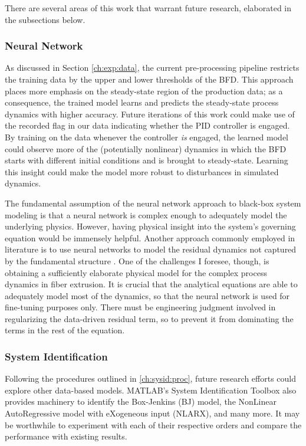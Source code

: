 There are several areas of this work that warrant future research, elaborated in the subsections below. 

\subsubsection{Neural Network}

As discussed in Section \ref{ch:exp:data}, the current pre-processing pipeline restricts the training data by the upper and lower thresholds of the BFD. This approach places more emphasis on the steady-state region of the production data; as a consequence, the trained model learns and predicts the steady-state process dynamics with higher accuracy. Future iterations of this work could make use of the recorded flag in our data indicating whether the PID controller is engaged. By training on the data whenever the controller \emph{is} engaged, the learned model could observe more of the (potentially nonlinear) dynamics in which the BFD starts with different initial conditions and is brought to steady-state. Learning this insight could make the model more robust to disturbances in simulated dynamics. 

The fundamental assumption of the neural network approach to black-box system modeling is that a neural network is complex enough to adequately model the underlying physics. However, having physical insight into the system's governing equation would be immensely helpful. Another approach commonly employed in literature is to use neural networks to model the residual dynamics not captured by the fundamental structure \cite{tossingbot_zeng_residual_physics}. One of the challenges I foresee, though, is obtaining a sufficiently elaborate physical model for the complex process dynamics in fiber extrusion. It is crucial that the analytical equations are able to adequately model most of the dynamics, so that the neural network is used for fine-tuning purposes only. There must be engineering judgment involved in regularizing the data-driven residual term, so to prevent it from dominating the terms in the rest of the equation. 

\subsubsection{System Identification}

Following the procedures outlined in \ref{ch:sysid:proc}, future research efforts could explore other data-based models. MATLAB's System Identification Toolbox also provides machinery to identify the Box-Jenkins (BJ) model, the NonLinear AutoRegressive model with eXogeneous input (NLARX), and many more. It may be worthwhile to experiment with each of their respective orders and compare the performance with existing results. 

